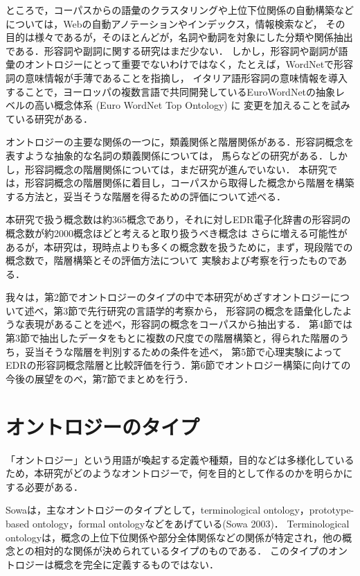 \documentclass[japanese]{jnlp_1.4}
\begin{document}
ところで，コーパスからの語彙のクラスタリングや上位下位関係の自動構築などについては，Webの自動アノテーションやインデックス，情報検索など，
その目的は様々であるが，そのほとんどが，名詞や動詞を対象にした分類や関係抽出である．形容詞や副詞に関する研究はまだ少ない．
しかし，形容詞や副詞が語彙のオントロジーにとって重要でないわけではなく，たとえば，WordNetで形容詞の意味情報が手薄であることを指摘し，
イタリア語形容詞の意味情報を導入することで，ヨーロッパの複数言語で共同開発しているEuroWordNetの抽象レベルの高い概念体系 (Euro WordNet Top Ontology) に
変更を加えることを試みている研究がある\cite{Inproc_01}．

オントロジーの主要な関係の一つに，類義関係と階層関係がある．形容詞概念を表すような抽象的な名詞の類義関係については，
馬らなどの研究がある\cite{Article_21}．しかし，形容詞概念の階層関係については，まだ研究が進んでいない．
本研究では，形容詞概念の階層関係に着目し，コーパスから取得した概念から階層を構築する方法と，妥当そうな階層を得るための評価について述べる．

本研究で扱う概念数は約365概念であり，それに対しEDR電子化辞書の形容詞の概念数が約2000概念ほどと考えると取り扱うべき概念は
さらに増える可能性があるが，本研究は，現時点よりも多くの概念数を扱うために，まず，現段階での概念数で，階層構築とその評価方法について
実験および考察を行ったものである．

我々は，第2節でオントロジーのタイプの中で本研究がめざすオントロジーについて述べ，第3節で先行研究の言語学的考察から，
形容詞の概念を語彙化したような表現があることを述べ，形容詞の概念をコーパスから抽出する．
第4節では第3節で抽出したデータをもとに複数の尺度での階層構築と，得られた階層のうち，妥当そうな階層を判別するための条件を述べ，
第5節で心理実験によってEDRの形容詞概念階層と比較評価を行う．第6節でオントロジー構築に向けての今後の展望をのべ，第7節でまとめを行う．


\section{オントロジーのタイプ}

「オントロジー」という用語が喚起する定義や種類，目的などは多様化しているため，本研究がどのようなオントロジーで，何を目的として作るのかを明らかにする必要がある．

Sowaは，主なオントロジーのタイプとして，terminological ontology，prototype-based ontology，formal ontologyなどをあげている(Sowa 2003)．
Terminological ontologyは，概念の上位下位関係や部分全体関係などの関係が特定され，他の概念との相対的な関係が決められているタイプのものである．
このタイプのオントロジーは概念を完全に定義するものではない．
\end{document}
